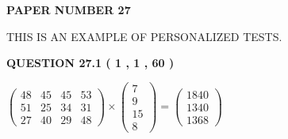 \documentclass[12pt]{article}
\begin{document}
   
   
   
 {\textbf{ \Large{ PAPER NUMBER           27  }}}
   
   
\vspace{0.2in}
   
   
   
   
   
   
 \vspace{0.2in}
{\Huge  THIS IS AN EXAMPLE OF}
{\Huge  PERSONALIZED TESTS. }
   
   
  
\vspace{0.2in}
  
{\textbf{\Large{QUESTION
27.1 
 (           1 ,           1 ,          60 )
}}}
  
  
 
 
\noindent{}

 
$\left( \begin{array}{ccccccccccccccc}
          48  & 
          45  & 
          45  & 
          53  \\ 
          51  & 
          25  & 
          34  & 
          31  \\ 
          27  & 
          40  & 
          29  & 
          48
\end{array}\right) \times
\left( \begin{array}{c}
           7  \\ 
           9  \\ 
          15  \\ 
           8
\end{array}\right)  =
\left( \begin{array}{c}
        1840  \\ 
        1340  \\ 
        1368
\end{array}\right)  $
 
\end{document}

